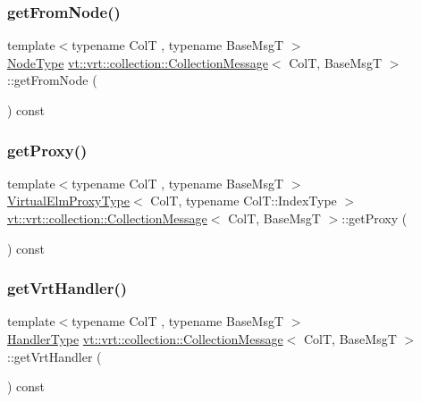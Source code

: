 \subsubsection{\texorpdfstring{get\+From\+Node()}{getFromNode()}}
{\footnotesize\ttfamily template$<$typename ColT , typename Base\+MsgT $>$ \\
\hyperlink{namespacevt_a866da9d0efc19c0a1ce79e9e492f47e2}{Node\+Type} \hyperlink{structvt_1_1vrt_1_1collection_1_1_collection_message}{vt\+::vrt\+::collection\+::\+Collection\+Message}$<$ ColT, Base\+MsgT $>$\+::get\+From\+Node (\begin{DoxyParamCaption}{ }\end{DoxyParamCaption}) const}

\mbox{\label{structvt_1_1vrt_1_1collection_1_1_collection_message_a195386067f31cffdecbce5f05bfba5f2}} 
\subsubsection{\texorpdfstring{get\+Proxy()}{getProxy()}}
{\footnotesize\ttfamily template$<$typename ColT , typename Base\+MsgT $>$ \\
\hyperlink{namespacevt_1_1vrt_a620a5c8c59d13e513f690c74b4af516f}{Virtual\+Elm\+Proxy\+Type}$<$ ColT, typename Col\+T\+::\+Index\+Type $>$ \hyperlink{structvt_1_1vrt_1_1collection_1_1_collection_message}{vt\+::vrt\+::collection\+::\+Collection\+Message}$<$ ColT, Base\+MsgT $>$\+::get\+Proxy (\begin{DoxyParamCaption}{ }\end{DoxyParamCaption}) const}

\mbox{\label{structvt_1_1vrt_1_1collection_1_1_collection_message_aa5966355f4fe5f9ac7dc965a7f6e4de4}} 
\subsubsection{\texorpdfstring{get\+Vrt\+Handler()}{getVrtHandler()}}
{\footnotesize\ttfamily template$<$typename ColT , typename Base\+MsgT $>$ \\
\hyperlink{namespacevt_af64846b57dfcaf104da3ef6967917573}{Handler\+Type} \hyperlink{structvt_1_1vrt_1_1collection_1_1_collection_message}{vt\+::vrt\+::collection\+::\+Collection\+Message}$<$ ColT, Base\+MsgT $>$\+::get\+Vrt\+Handler (\begin{DoxyParamCaption}{ }\end{DoxyParamCaption}) const}

